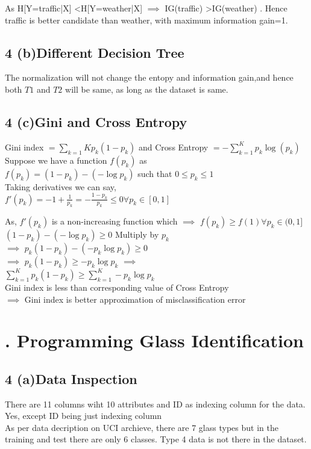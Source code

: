 \documentclass[10pt,letterpaper]{article}
\begin{document}
As H[Y=traffic|X] \textless H[Y=weather|X] $\implies$ IG(traffic) \textgreater IG(weather) .
Hence traffic is better candidate than weather, with maximum information gain=1. 


\subsection{4 (b)Different Decision Tree}
The normalization will not change the entopy and information gain,and hence both $T1$ and $T2$ will be same, as long as the dataset is same.

\subsection{4 (c)Gini and Cross Entropy}
Gini index $ =\sum_{k=1}K p_k(1-p_k)$ and 
Cross Entropy $=-\sum_{k=1}^K p_k\log(p_k)$ \\
Suppose we have a function $ f(p_k)$ as\\
 $f(p_k)=(1-p_k)-(- \log p_k)$ such that $0 \leq p_k \leq 1$ \\

Taking derivatives we can say,\\
 $f'(p_k) = -1+\frac{1}{p_k} = -\frac{1-p_k}{p_k} \leq 0      \forall p_k \in[0,1]$
				
As, $f'(p_k)$ is a non-increasing function which $\implies$ $f(p_k) \geq f(1) \forall p_k \in (0,1]$\\
$(1-p_k)-(- \log p_k) \geq 0$ Multiply by $p_k$\\
$\implies$ $p_k(1-p_k)-(-p_k \log p_k) \geq 0$ \\
$\implies$ $p_k(1-p_k) \geq -p_k\log p_k$  $\implies$  \\
$\sum_{k=1}^K p_k(1-p_k) \geq \sum_{k=1}^K-p_k\log p_k$ \\
Gini index is less than corresponding value of Cross Entropy \\
$\implies$ Gini index is better approximation of misclassification error\\

\section{. Programming Glass Identification}
\subsection{4 (a)Data Inspection}
	There are 11 columns wiht 10 attributes and ID as indexing column for the data.\\
	Yes, except ID being just indexing column \\
	As per data decription on UCI archieve, there are 7 glass types but in the training and test there are only 6 classes. 		Type 4 data is not there in the dataset.\\
	
\end{document}
